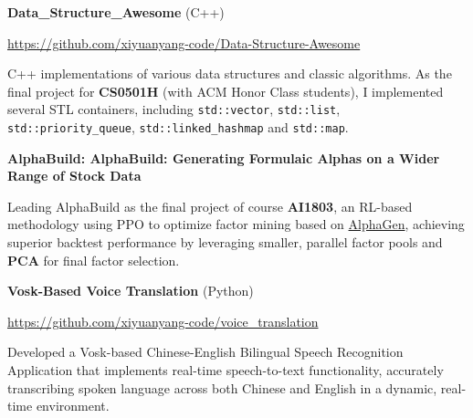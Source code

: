 \documentclass[letterpaper,11pt]{article}
\begin{document}
{\bfseries\selectfont Data\_Structure\_Awesome} (C++)

\url{https://github.com/xiyuanyang-code/Data-Structure-Awesome}

C++ implementations of various data structures and classic algorithms. As the final project for \textbf{CS0501H} (with ACM Honor Class students), I implemented several STL containers, including \texttt{std::vector}, \texttt{std::list}, \texttt{std::priority\_queue}, \texttt{std::linked\_hashmap} and \texttt{std::map}.
\newline






\textbf{AlphaBuild: AlphaBuild: Generating Formulaic Alphas on a Wider Range of Stock Data}

Leading AlphaBuild as the final project of course \textbf{AI1803}, an RL-based methodology using PPO to optimize factor mining based on \href{https://github.com/RL-MLDM/alphagen}{AlphaGen}, achieving superior backtest performance by leveraging smaller, parallel factor pools and \textbf{PCA} for final factor selection.
\newline

\textbf{Vosk-Based Voice Translation} (Python)

\url{https://github.com/xiyuanyang-code/voice_translation}

Developed a Vosk-based Chinese-English Bilingual Speech Recognition Application that implements real-time speech-to-text functionality, accurately transcribing spoken language across both Chinese and English in a dynamic, real-time environment.
\newline
\end{document}
